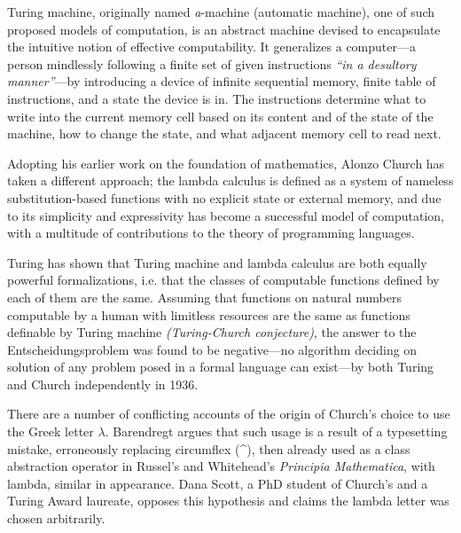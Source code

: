 \documentclass[table, a4paper, 10pt]{article}
\newcommand{\cit}[1]{\textsuperscript{\cite{#1}}}
\begin{document}
Turing machine, originally named \textit{a}-machine (automatic machine), one of such proposed
models of computation, is an abstract machine devised
to encapsulate the intuitive notion of effective computability. It generalizes
a computer---a person mindlessly following a finite set of given
instructions \textit{``in a desultory manner''}---by introducing
a device of infinite sequential memory, finite table of instructions, and
a state the device is in. The instructions determine what to write into the
current memory cell based on its content and of the state of the machine,
how to change the state, and what adjacent memory cell to read next.\cit{turingPaper}

Adopting his earlier work on the foundation of mathematics, Alonzo Church
has taken a different approach; the lambda calculus is defined
as a system of nameless substitution-based functions with no explicit state or external memory,
and due to its simplicity and expressivity has become a successful model of computation,
with a multitude of contributions to the theory of programming languages.
 
Turing has shown that Turing machine and lambda calculus are both equally powerful formalizations, i.e. that
the classes of computable functions defined by each of them are the same.\cit{turingDefin}
Assuming that functions on natural numbers computable by a human
with limitless resources are the same as functions definable by Turing machine \textit{(Turing-Church conjecture)},
the answer to the Entscheidungsproblem was found to be negative---no algorithm deciding on
solution of any problem posed in a formal language can exist---by both Turing and Church
independently in 1936.\cit{turingPaper}\cit{churchPaper}

There are a number of conflicting accounts of the origin of Church's choice
to use the Greek letter $\lambda$. Barendregt argues that such usage
is a result of a typesetting mistake, erroneously replacing circumflex (\^{}),
then already used as a class abstraction operator in Russel's and Whitehead's
\textit{Principia Mathematica}, with lambda, similar in appearance.\cit{barenImpact}
Dana Scott, a PhD student of Church's and a Turing Award laureate, opposes this
hypothesis and claims the lambda letter was chosen arbitrarily.\cit{scottLecture}

\printbibliography
\end{document}
